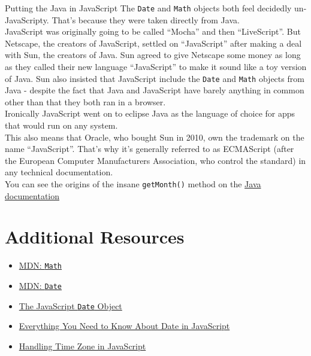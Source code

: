 \begin{infobox}{Putting the Java in JavaScript}
    The \texttt{Date} and \texttt{Math} objects both feel decidedly un-JavaScripty. That's because they were taken directly from Java.
    \\

    JavaScript was originally going to be called ``Mocha'' and then ``LiveScript''. But Netscape, the creators of JavaScript, settled on ``JavaScript'' after making a deal with Sun, the creators of Java. Sun agreed to give Netscape some money as long as they called their new language ``JavaScript'' to make it sound like a toy version of Java. Sun also insisted that JavaScript include the \texttt{Date} and \texttt{Math} objects from Java - despite the fact that Java and JavaScript have barely anything in common other than that they both ran in a browser.
    \\

    Ironically JavaScript went on to eclipse Java as the language of choice for apps that would run on any system.
    \\

    This also means that Oracle, who bought Sun in 2010, own the trademark on the name ``JavaScript''. That's why it's generally referred to as ECMAScript (after the European Computer Manufacturers Association, who control the standard) in any technical documentation.
    \\

    You can see the origins of the insane \texttt{getMonth()} method on the \href{https://docs.oracle.com/javase/7/docs/api/java/util/Date.html#getMonth()}{Java documentation}
\end{infobox}

\section{Additional Resources}

\begin{itemize}[leftmargin=*]
    \item \href{https://developer.mozilla.org/en-US/docs/Web/JavaScript/Reference/Global_Objects/Math}{MDN: \texttt{Math}}
    \item \href{https://developer.mozilla.org/en-US/docs/Web/JavaScript/Reference/Global_Objects/Date}{MDN: \texttt{Date}}
    \item \href{https://alligator.io/js/date-object/}{The JavaScript \texttt{Date} Object}
    \item \href{https://css-tricks.com/everything-you-need-to-know-about-date-in-javascript/}{Everything You Need to Know About Date in JavaScript}
    \item \href{https://medium.com/@toastui/handling-time-zone-in-javascript-547e67aa842d}{Handling Time Zone in JavaScript}
\end{itemize}
